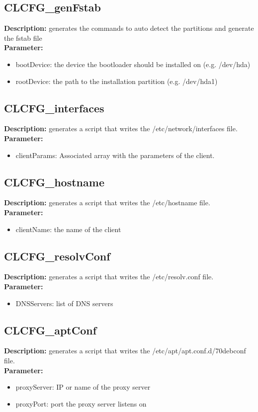 \subsection{CLCFG\_genFstab}
\textbf{Description:} generates the commands to auto detect the partitions and generate the fstab file\\
\textbf{Parameter:}
\begin{itemize}
\item bootDevice: the device the bootloader should be installed on (e.g. /dev/hda)
\item rootDevice: the path to the installation partition (e.g. /dev/hda1)
\end{itemize}

\subsection{CLCFG\_interfaces}
\textbf{Description:} generates a script that writes the /etc/network/interfaces file.\\
\textbf{Parameter:}
\begin{itemize}
\item clientParams: Associated array with the parameters of the client.
\end{itemize}

\subsection{CLCFG\_hostname}
\textbf{Description:} generates a script that writes the /etc/hostname file.\\
\textbf{Parameter:}
\begin{itemize}
\item clientName: the name of the client
\end{itemize}

\subsection{CLCFG\_resolvConf}
\textbf{Description:} generates a script that writes the /etc/resolv.conf file.\\
\textbf{Parameter:}
\begin{itemize}
\item DNSServers: list of DNS servers
\end{itemize}

\subsection{CLCFG\_aptConf}
\textbf{Description:} generates a script that writes the /etc/apt/apt.conf.d/70debconf file.\\
\textbf{Parameter:}
\begin{itemize}
\item proxyServer: IP or name of the proxy server
\item proxyPort: port the proxy server listens on
\end{itemize}

